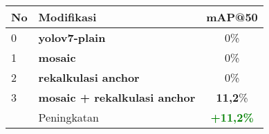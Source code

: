 \begin{table}[h]
  \centering
  \label{tbl:mosaic_reanchor_performance}
  \vspace{-1ex}
  \begin{tabular}{ l l c }
    \toprule[1.5pt]
    No & Modifikasi        &mAP@50 \\
    \midrule
    0  & \textbf{yolov7-plain               }& 0\%\\
    1  & \textbf{mosaic                     }& 0\%\\
    2  & \textbf{rekalkulasi anchor         }& 0\%\\
    3  & \textbf{mosaic + rekalkulasi anchor}& \textbf{11,2}\%\\
    \midrule
       & Peningkatan                         & \textbf{\textcolor{green}{+11,2\%}}\\
    \bottomrule[1.5pt]
  \end{tabular}
\end{table}